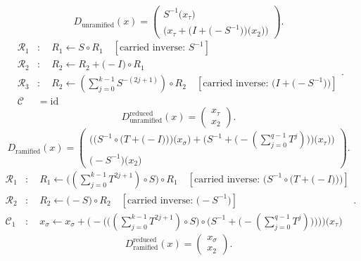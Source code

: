 \[D_{\mathrm{unramified}}(x)=\begin{pmatrix}S^{-1}\bigl(x_{\tau}\bigr)\\\bigl(x_{\tau}+\bigl(I+\bigl(-S^{-1}\bigr)\bigr)\bigl(x_{2}\bigr)\bigr)\end{pmatrix}.\]
\[\begin{aligned}\mathcal R_{1}&:\quad R_1 \leftarrow S\circ R_1\quad[\text{carried inverse: }S^{-1}]\\\mathcal R_{2}&:\quad R_2 \leftarrow R_2+\bigl(-I\bigr)\circ R_1\\\mathcal R_{3}&:\quad R_2 \leftarrow \left(\sum_{j=0}^{k-1}S^{-(2j+1)}\right)\circ R_2\quad[\text{carried inverse: }\bigl(I+\bigl(-S^{-1}\bigr)\bigr)]\\\mathcal C&=\mathrm{id}\end{aligned}.\]
\[D_{\mathrm{unramified}}^{\mathrm{reduced}}(x)=\begin{pmatrix}x_{\tau}\\x_{2}\end{pmatrix}.\]
\[D_{\mathrm{ramified}}(x)=\begin{pmatrix}\bigl(\bigl(S^{-1}\circ \bigl(T+\bigl(-I\bigr)\bigr)\bigr)\bigl(x_{\sigma}\bigr)+\bigl(S^{-1}+\bigl(-\left(\sum_{j=0}^{q-1}T^{j}\right)\bigr)\bigr)\bigl(x_{\tau}\bigr)\bigr)\\\bigl(-S^{-1}\bigr)\bigl(x_{2}\bigr)\end{pmatrix}.\]
\[\begin{aligned}\mathcal R_{1}&:\quad R_1 \leftarrow \bigl(\left(\sum_{j=0}^{k-1}T^{2j+1}\right)\circ S\bigr)\circ R_1\quad[\text{carried inverse: }\bigl(S^{-1}\circ \bigl(T+\bigl(-I\bigr)\bigr)\bigr)]\\\mathcal R_{2}&:\quad R_2 \leftarrow \bigl(-S\bigr)\circ R_2\quad[\text{carried inverse: }\bigl(-S^{-1}\bigr)]\\\mathcal C_{1}&:\quad x_{\sigma}\leftarrow x_{\sigma}+\bigl(-\bigl(\bigl(\left(\sum_{j=0}^{k-1}T^{2j+1}\right)\circ S\bigr)\circ \bigl(S^{-1}+\bigl(-\left(\sum_{j=0}^{q-1}T^{j}\right)\bigr)\bigr)\bigr)\bigr)\bigl(x_{\tau}\bigr)\end{aligned}.\]
\[D_{\mathrm{ramified}}^{\mathrm{reduced}}(x)=\begin{pmatrix}x_{\sigma}\\x_{2}\end{pmatrix}.\]
